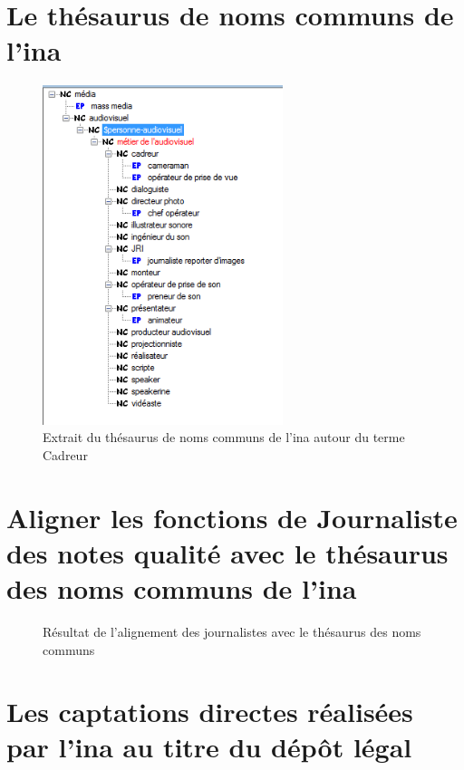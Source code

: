 \chapter{\label{annexe_thesaurus}Le thésaurus de noms communs de l'\ac{ina}}

\begin{figure}[!h]
	\centering
	\includegraphics[width=7cm]{images/cadreur_hierarchie.png}
	\medskip
	\caption[Extrait du thésaurus de noms communs de l'\ac{ina}]{Extrait du thésaurus de noms communs de l'\ac{ina} autour du terme \og Cadreur\fg{}}
	\label{thesaurus_cadreur}
\end{figure}

\chapter{\label{annexe_alignement_journaliste}Aligner les fonctions de \og Journaliste\fg{} des notes qualité avec le thésaurus des noms communs de l'\ac{ina}}

\begin{figure}[!h]
	\centering
	\caption{Résultat de l'alignement des journalistes avec le thésaurus des noms communs}
	\label{alignement_journaliste}
\end{figure}

\chapter{\label{annexe_dl_captation}Les captations directes réalisées par l'\ac{ina} au titre du dépôt légal}

